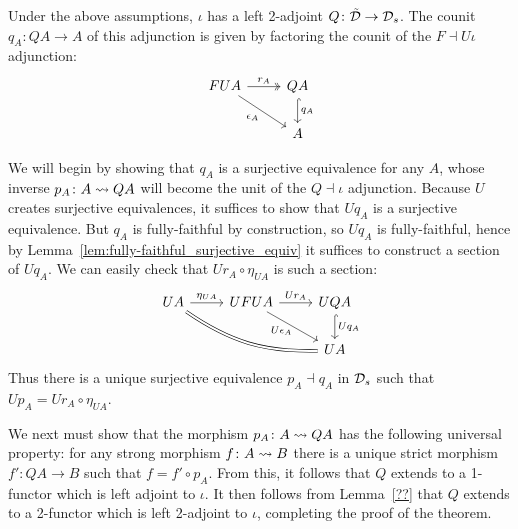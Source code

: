 \documentclass[11pt,oneside,article]{memoir}
\begin{document}
\begin{theorem}\label{thm:strong_classifier}
   Under the above assumptions, $\iota$ has a left 2-adjoint $Q\colon\tilde{\mathcal{D}}\to\mathcal{D}_s$. The
   counit $q_A\colon QA\to A$ of this adjunction is given by factoring the counit of the
   $F\dashv U\iota$ adjunction:
   \begin{equation}
      \begin{tikzcd}
         FUA \ar[r,two heads,"r_A"] \ar[dr,"\epsilon_A"']
            & QA \ar[d,hook,"q_A"] \\
         & A
      \end{tikzcd}
   \end{equation}
\end{theorem}

We will begin by showing that $q_A$ is a surjective equivalence for any $A$, whose inverse
$p_A\colon A\rightsquigarrow QA$ will become the unit of the $Q\dashv\iota$ adjunction. Because $U$ creates
surjective equivalences, it suffices to show that $Uq_A$ is a surjective equivalence. But $q_A$
is fully-faithful by construction, so $Uq_A$ is fully-faithful, hence by
Lemma~\ref{lem:fully-faithful_surjective_equiv} it suffices to construct a section of $Uq_A$. We can
easily check that $Ur_A\circ\eta_{UA}$ is such a section:
\begin{equation*}
   \begin{tikzcd}
      UA \ar[r,"\eta_{UA}"] \ar[rrd,bend right=18,equal]
         & UFUA \ar[r,"Ur_A"] \ar[dr,"U\epsilon_A"' inner sep=0pt]
         & UQA \ar[d,hook,"Uq_A"] \\
      && UA
   \end{tikzcd}
\end{equation*}
Thus there is a unique surjective equivalence $p_A\dashv q_A$ in $\mathcal{D}_s$ such that
$Up_A= Ur_A\circ\eta_{UA}$.

We next must show that the morphism $p_A\colon A\rightsquigarrow QA$ has the following universal property: for
any strong morphism $f\colon A\rightsquigarrow B$ there is a unique strict morphism $f'\colon QA\to B$ such that
$f=f'\circ p_A$. From this, it follows that $Q$ extends to a 1-functor which is left adjoint to
$\iota$. It then follows from Lemma~\ref{??} that $Q$ extends to a 2-functor which is left 2-adjoint
to $\iota$, completing the proof of the theorem.
\end{document}
